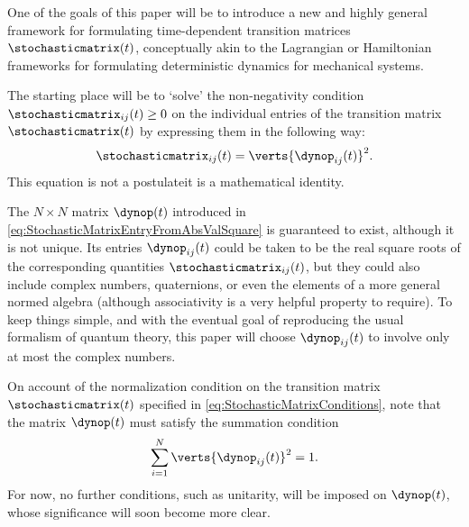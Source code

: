 \documentclass[12pt,english,prl,superscriptaddress,nobibnotes,nofootinbib]{revtex4-2}
\let\originalleft\left
\let\originalright\right
\renewcommand{\left}{\mathopen{}\mathclose\bgroup\originalleft}
\renewcommand{\right}{\aftergroup\egroup\originalright}
\begin{document}
One of the goals of this paper will be to introduce a new and highly
general framework for formulating time-dependent transition matrices
$\stochasticmatrix\left(t\right)$, conceptually akin to the Lagrangian
or Hamiltonian frameworks for formulating deterministic dynamics for
mechanical systems.

The starting place will be to \textquoteleft solve\textquoteright{}
the non-negativity condition $\stochasticmatrix_{ij}\left(t\right)\geq0$
on the individual entries of the transition matrix $\stochasticmatrix\left(t\right)$
by expressing them in the following way: 
\begin{equation}
\stochasticmatrix_{ij}\left(t\right)=\verts{\dynop_{ij}\left(t\right)}^{2}.\label{eq:StochasticMatrixEntryFromAbsValSquare}
\end{equation}
 This equation is not a postulate\textemdash it is a mathematical
identity.

The $N\times N$ matrix $\dynop\left(t\right)$ introduced in \eqref{eq:StochasticMatrixEntryFromAbsValSquare}
is guaranteed to exist, although it is not unique. Its entries $\dynop_{ij}\left(t\right)$
could be taken to be the real square roots of the corresponding quantities
$\stochasticmatrix_{ij}\left(t\right)$, but they could also include
complex numbers, quaternions, or even the elements of a more general
normed algebra (although associativity is a very helpful property
to require). To keep things simple, and with the eventual goal of
reproducing the usual formalism of quantum theory, this paper will
choose $\dynop_{ij}\left(t\right)$ to involve only at most the complex
numbers.

On account of the normalization condition on the transition matrix
$\stochasticmatrix\left(t\right)$ specified in \eqref{eq:StochasticMatrixConditions},
note that the matrix $\dynop\left(t\right)$ must satisfy the summation
condition 
\begin{equation}
\sum_{i=1}^{N}\verts{\dynop_{ij}\left(t\right)}^{2}=1.\label{eq:SumTimeEvOpAbsValSqEq1}
\end{equation}
 For now, no further conditions, such as unitarity, will be imposed
on $\dynop\left(t\right)$, whose significance will soon become more
clear.
\end{document}
